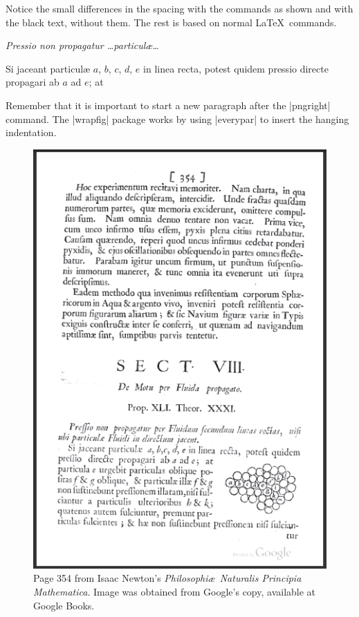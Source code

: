 \vspace*{-37pt}


Notice the small differences in the spacing with the commands as shown and with the black text, without them. The rest is based on normal \LaTeX\ commands.

\textit{Pressio non propagatur \ldots particul{\ae}\ldots}


Si jaceant particul{\ae} $a$, $b$, $c$, $d$,
$e$ in linea recta, potest quidem
pressio directe propagari ab $a$ ad $e$; at


Remember that it is important to start a new paragraph after the 
|pngright| command. The |wrapfig| package works by using |everypar| to insert the hanging indentation.

\begin{figure}[p]
\centering
\includegraphics[scale=1]{./images/page354.png}
\caption{Page 354 from Isaac Newton's \textit{Philosophi\ae\  Naturalis Principia Mathematica}. Image was obtained from Google's copy, available at Google Books.}
\label{fig:principia}
\end{figure}
\makeatother
